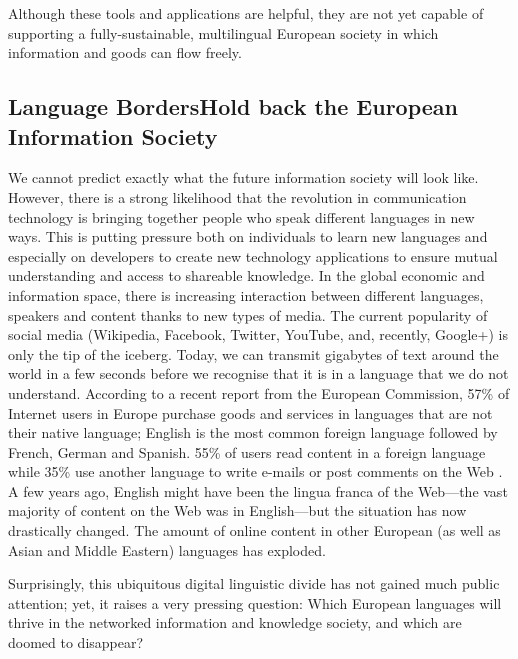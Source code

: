 \documentclass{../../metanetpaper}
\begin{document}
\begin{multicols}{2}
Although these tools and applications are helpful, they are not yet capable of supporting a fully-sustainable, multilingual European society in which information and goods can flow freely.

\subsection[Language Borders Hold back the European Information Society]{Language Borders\newline Hold back the European Information Society}

We cannot predict exactly what the future information society will look like. However, there is a strong likelihood that the revolution in communication technology is bringing together people who speak different languages in new ways. This is putting pressure both on individuals to learn new languages and especially on developers to create new technology applications to ensure mutual understanding and access to shareable knowledge. In the global economic and information space, there is increasing interaction between different languages, speakers and content thanks to new types of media. The current popularity of social media (Wikipedia, Facebook, Twitter, YouTube, and, recently, Google+) is only the tip of the iceberg.
Today, we can transmit gigabytes of text around the world in a few seconds before we recognise that it is in a language that we do not understand. According to a recent report from the European Commission, 57\% of Internet users in Europe purchase goods and services in languages that are not their native language; English is the most common foreign language followed by French, German and Spanish. 55\% of users read content in a foreign language while 35\% use another language to write e-mails or post comments on the Web \cite{EC1}. A few years ago, English might have been the lingua franca of the Web—the vast majority of content on the Web was in English—but the situation has now drastically changed. The amount of online content in other European (as well as Asian and Middle Eastern) languages has exploded.

Surprisingly, this ubiquitous digital linguistic divide has not gained much public attention; yet, it raises a very pressing question: Which European languages will thrive in the networked information and knowledge society, and which are doomed to disappear?


\end{multicols}
\end{document}
